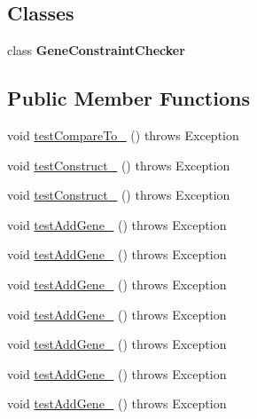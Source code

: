 \subsection*{Classes}
\begin{DoxyCompactItemize}
\item 
class {\bfseries Gene\-Constraint\-Checker}
\end{DoxyCompactItemize}
\subsection*{Public Member Functions}
\begin{DoxyCompactItemize}
\item 
void \hyperlink{classorg_1_1jgap_1_1impl_1_1_composite_gene_test_a13d509e6ee8a3321b06734430897bf2d}{test\-Compare\-To\-\_} ()  throws Exception 
\item 
void \hyperlink{classorg_1_1jgap_1_1impl_1_1_composite_gene_test_a5af6d78dbbe50c0bd4e79605e00dc870}{test\-Construct\-\_} ()  throws Exception 
\item 
void \hyperlink{classorg_1_1jgap_1_1impl_1_1_composite_gene_test_af585ac145b203d43bad210641c0ce08b}{test\-Construct\-\_} ()  throws Exception 
\item 
void \hyperlink{classorg_1_1jgap_1_1impl_1_1_composite_gene_test_ab696648cc690dbe1587e5a13da8017c3}{test\-Add\-Gene\-\_} ()  throws Exception 
\item 
void \hyperlink{classorg_1_1jgap_1_1impl_1_1_composite_gene_test_a2b1bdeba5166eb54d879d42bd04b6d66}{test\-Add\-Gene\-\_} ()  throws Exception 
\item 
void \hyperlink{classorg_1_1jgap_1_1impl_1_1_composite_gene_test_a41f10da19cc7dce4e445f1474c4b761f}{test\-Add\-Gene\-\_} ()  throws Exception 
\item 
void \hyperlink{classorg_1_1jgap_1_1impl_1_1_composite_gene_test_a89b95552976ca5b3f997f8510461a4b6}{test\-Add\-Gene\-\_} ()  throws Exception 
\item 
void \hyperlink{classorg_1_1jgap_1_1impl_1_1_composite_gene_test_a4f9ac7474b593f9202979d4b5841edc0}{test\-Add\-Gene\-\_} ()  throws Exception 
\item 
void \hyperlink{classorg_1_1jgap_1_1impl_1_1_composite_gene_test_adbd6ad86fbee53ba82596500957a20de}{test\-Add\-Gene\-\_} ()  throws Exception 
\item 
void \hyperlink{classorg_1_1jgap_1_1impl_1_1_composite_gene_test_af8db5094cf7d95f10ce6e49e7f00cf63}{test\-Add\-Gene\-\_} ()  throws Exception 

\end{DoxyCompactItemize}
